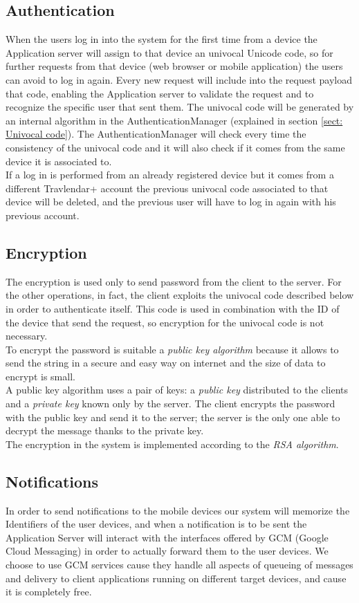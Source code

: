 \subsection{Authentication}
When the users log in into the system for the first time from a device the Application server will assign to that device an univocal Unicode code, so for further requests from that device (web browser or mobile application) the users can avoid to log in again. Every new request will include into the request payload that code, enabling the Application server to validate the request and to recognize the specific user that sent them. The univocal code will be generated by an internal algorithm in the AuthenticationManager (explained in section \ref{sect: Univocal code}). The AuthenticationManager will check every time the consistency of the univocal code and it will also check if it comes from the same device it is associated to.\\
If a log in is performed from an already registered device but it comes from a different Travlendar+ account the previous univocal code associated to that device will be deleted, and the previous user will have to log in again with his previous account.

\subsection{Encryption}
The encryption is used only to send password from the client to the server. For the other operations, in fact, the client exploits the univocal code described below in order to authenticate itself. This code is used in combination with the ID of the device that send the request, so encryption for the univocal code is not necessary.\\
To encrypt the password is suitable a \textit{public key algorithm} because it allows to send the string in a secure and easy way on internet and the size of data to encrypt is small.\\
A public key algorithm uses a pair of keys: a \textit{public key} distributed to the clients and a \textit{private key} known only by the server. The client encrypts the password with the public key and send it to the server; the server is the only one able to decrypt the message thanks to the private key.\\
The encryption in the system is implemented according to the \textit{RSA algorithm}.

\subsection{Notifications}
\label{subsect: Notifications}
In order to send notifications to the mobile devices our system will memorize the Identifiers of the user devices, and when a notification is to be sent the Application Server will interact with the interfaces offered by GCM (Google Cloud Messaging) in order to actually forward them to the user devices. We choose to use GCM services cause they handle all aspects of queueing of messages and delivery to client applications running on different target devices, and cause it is completely free.

